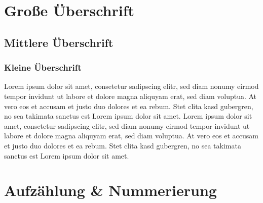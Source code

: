 \documentclass[a4paper,12pt]{article}
\begin{document}
\pagestyle{empty}

\tableofcontents

\newpage

\pagestyle{fancy}

\section{Große Überschrift}
\subsection{Mittlere Überschrift}
\subsubsection{Kleine Überschrift}

Lorem ipsum dolor sit amet, consetetur sadipscing elitr, sed diam nonumy eirmod tempor invidunt ut labore et dolore magna aliquyam erat, sed diam voluptua. At vero eos et accusam et justo duo dolores et ea rebum. Stet clita kasd gubergren, no sea takimata sanctus est Lorem ipsum dolor sit amet. Lorem ipsum dolor sit amet, consetetur sadipscing elitr, sed diam nonumy eirmod tempor invidunt ut labore et dolore magna aliquyam erat, sed diam voluptua. At vero eos et accusam et justo duo dolores et ea rebum. Stet clita kasd gubergren, no sea takimata sanctus est Lorem ipsum dolor sit amet.

\newpage

\section{Aufzählung \& Nummerierung}
\end{document}
